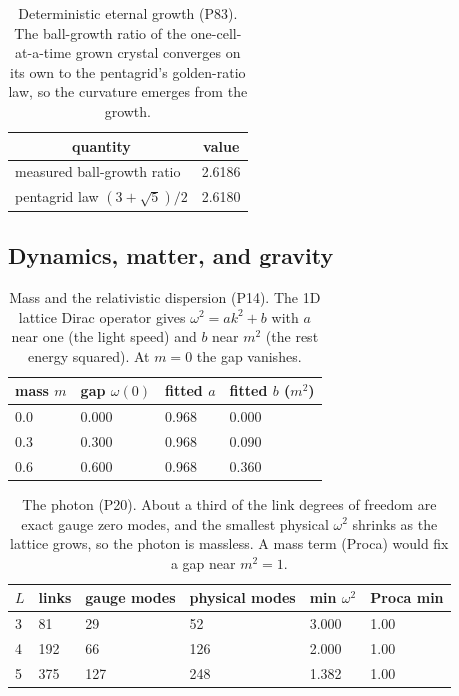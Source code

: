 \begin{table}[H]
\centering
\small
\begin{tabular}{ll}
\toprule
\multicolumn{1}{c}{quantity} & \multicolumn{1}{c}{value} \\
\midrule
measured ball-growth ratio & 2.6186 \\
pentagrid law $(3+\sqrt 5)/2$ & 2.6180 \\
\bottomrule
\end{tabular}
\caption{Deterministic eternal growth (P83). The ball-growth ratio of the one-cell-at-a-time grown crystal converges on its own to the pentagrid's golden-ratio law, so the curvature emerges from the growth.}
\end{table}

\subsection{Dynamics, matter, and gravity}

\begin{table}[H]
\centering
\small
\begin{tabular}{llll}
\toprule
\multicolumn{1}{c}{mass $m$} & \multicolumn{1}{c}{gap $\omega(0)$} & \multicolumn{1}{c}{fitted $a$} & \multicolumn{1}{c}{fitted $b$ ($m^2$)} \\
\midrule
0.0 & 0.000 & 0.968 & 0.000 \\
0.3 & 0.300 & 0.968 & 0.090 \\
0.6 & 0.600 & 0.968 & 0.360 \\
\bottomrule
\end{tabular}
\caption{Mass and the relativistic dispersion (P14). The 1D lattice Dirac operator gives $\omega^2 = a k^2 + b$ with $a$ near one (the light speed) and $b$ near $m^2$ (the rest energy squared). At $m=0$ the gap vanishes.}
\end{table}

\begin{table}[H]
\centering
\small
\begin{tabular}{llllll}
\toprule
\multicolumn{1}{c}{$L$} & \multicolumn{1}{c}{links} & \multicolumn{1}{c}{gauge modes} & \multicolumn{1}{c}{physical modes} & \multicolumn{1}{c}{min $\omega^2$} & \multicolumn{1}{c}{Proca min} \\
\midrule
3 & 81 & 29 & 52 & 3.000 & 1.00 \\
4 & 192 & 66 & 126 & 2.000 & 1.00 \\
5 & 375 & 127 & 248 & 1.382 & 1.00 \\
\bottomrule
\end{tabular}
\caption{The photon (P20). About a third of the link degrees of freedom are exact gauge zero modes, and the smallest physical $\omega^2$ shrinks as the lattice grows, so the photon is massless. A mass term (Proca) would fix a gap near $m^2 = 1$.}
\end{table}

